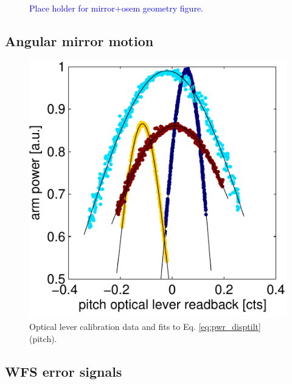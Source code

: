 \begin{figure}
\begin{centering}
\end{centering}
\caption{\textcolor{blue}{Place holder for mirror+osem geometry figure.}}
\label{fig:mirror_osem_geometry}
\end{figure}





\subsection{Angular mirror motion}


\begin{figure}
\begin{centering}
\includegraphics[width=1.0\columnwidth]{figures/OLcal_pitch.pdf}
\caption[Optical lever calibration]{Optical lever calibration data and fits to Eq. \ref{eq:pwr_disptilt} (pitch).}
\end{centering}
\end{figure}


\subsection{WFS error signals}



